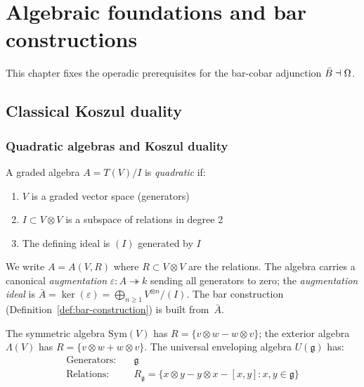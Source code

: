 \chapter{Algebraic foundations and bar constructions}\label{ch:algebraic-foundations}


This chapter fixes the operadic prerequisites for the bar-cobar adjunction $\bar{B} \dashv \Omega$.\label{rem:algebraic-foundations-hms}

\section{Classical Koszul duality}
\label{sec:classical-koszul-foundation}

\subsection{Quadratic algebras and Koszul duality}

\begin{definition}
\label{def:quadratic-algebra}
A graded algebra $A = T(V)/I$ is \emph{quadratic} if:
\begin{enumerate}
\item $V$ is a graded vector space (generators)
\item $I \subset V \otimes V$ is a subspace of relations in degree 2
\item The defining ideal is $(I)$ generated by $I$
\end{enumerate}
We write $A = A(V, R)$ where $R \subset V \otimes V$ are the
relations.  The algebra carries a canonical \emph{augmentation}
$\varepsilon \colon A \twoheadrightarrow k$ sending all generators
to zero; the \emph{augmentation ideal} is
$\bar{A} = \ker(\varepsilon) = \bigoplus_{n \geq 1} V^{\otimes n}/(I)$.
The bar construction (Definition~\ref{def:bar-construction})
is built from~$\bar{A}$.
\end{definition}

\begin{example}
\label{ex:classical-quadratic-algebras}
The symmetric algebra $\mathrm{Sym}(V)$ has $R = \{v \otimes w - w \otimes v\}$; the exterior algebra $\Lambda(V)$ has $R = \{v \otimes w + w \otimes v\}$.  The universal enveloping algebra $U(\mathfrak{g})$ has:
\begin{align}
\text{Generators:} &\quad \mathfrak{g} \\
\text{Relations:} &\quad R_{\mathfrak{g}} = \{x \otimes y - y \otimes x - [x,y] : x,y \in \mathfrak{g}\}
\end{align}
\end{example}

